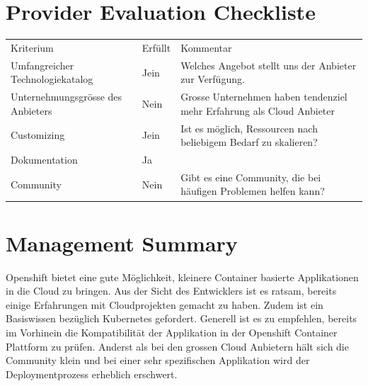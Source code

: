 \documentclass[12pt,a4paper]{article}
\begin{document}
\section{Provider Evaluation Checkliste}
    \begin{table}[]
        \begin{tabular}{lll}
            Kriterium & Erfüllt & Kommentar                                                                                 \\
            Umfangreicher Technologiekatalog & Jein & Welches Angebot stellt uns der Anbieter zur Verfügung.                \\
            Unternehmungsgrösse des Anbieters & Nein & Grosse Unternehmen haben tendenziel mehr Erfahrung als Cloud Anbieter\\
            Customizing & Jein & Ist es möglich, Ressourcen nach beliebigem Bedarf zu skalieren?                            \\
            Dokumentation & Ja &                                                                                            \\
            Community & Nein & Gibt es eine Community, die bei häufigen Problemen helfen kann?                              \\
        \end{tabular}
    \end{table}

\section{Management Summary}

Openshift bietet eine gute Möglichkeit, kleinere Container basierte Applikationen in die Cloud zu bringen. Aus der Sicht des Entwicklers
    ist es ratsam, bereits einige Erfahrungen mit Cloudprojekten gemacht zu haben. Zudem ist ein Basiswissen bezüglich Kubernetes gefordert.
    Generell ist es zu empfehlen, bereits im Vorhinein die Kompatibilität der Applikation in der Openshift Container Plattform zu prüfen.
    Anderst als bei den grossen Cloud Anbietern hält sich die Community klein und bei einer sehr spezifischen Applikation wird der Deploymentprozess
    erheblich erschwert.

    
\end{document}
